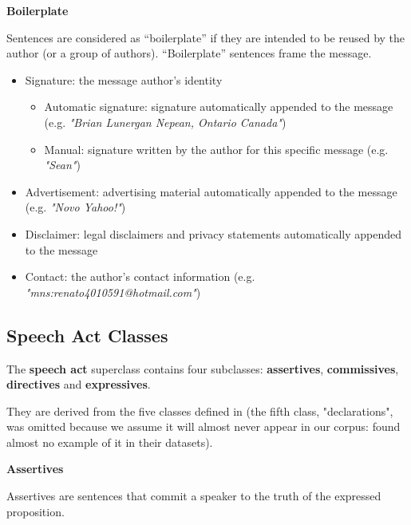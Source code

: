\documentclass[11pt]{article}
\begin{document}
\textbf{Boilerplate}
\vspace{0.1cm}

Sentences are considered as ``boilerplate'' if they are intended to be reused by the author (or a group of authors). ``Boilerplate'' sentences frame the message.

\begin{itemize}
	\item Signature: the message author's identity
		\begin{itemize}
			\item Automatic signature: signature automatically appended to the message (e.g. \textit{"Brian Lunergan Nepean, Ontario Canada"})
			\item Manual: signature written by the author for this specific message (e.g. \textit{"Sean"})
		\end{itemize}
	\item Advertisement: advertising material automatically appended to the message (e.g. \textit{"Novo Yahoo!"})
	\item Disclaimer: legal disclaimers and privacy statements automatically appended to the message
	\item Contact: the author's contact information (e.g. \textit{"mns:renato4010591@hotmail.com"})
\end{itemize}

\subsection{Speech Act Classes}
\label{subsec:speech_act_classes}

The \textbf{speech act} superclass contains four subclasses: \textbf{assertives}, \textbf{commissives}, \textbf{directives} and \textbf{expressives}. 

They are derived from the five classes defined in \cite{searle1976taxonomy} (the fifth class, "declarations", was omitted because we assume it will almost never appear in our corpus: \cite{qadir2011classifying} found almost no example of it in their datasets).

\vspace{0.3cm}
\textbf{Assertives}
\vspace{0.1cm}

Assertives are sentences that commit a speaker to the truth of the expressed proposition.
\end{document}
